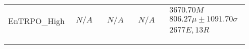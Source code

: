 \begin{tabular}{|l|p{3.2cm}|p{3.2cm}|p{3.2cm}|p{3.2cm}|}
EnTRPO_High & $\begin{array}{c} N/A \end{array}$ & $\begin{array}{c} N/A \end{array}$ & $\begin{array}{c} N/A \end{array}$ & $\begin{array}{c} 3670.70M \\ 806.27\mu \pm 1091.70\sigma \\ 2677E, 13R \end{array}$ \\ \\ \hline
\bottomrule \\ \hline
\end{tabular}
